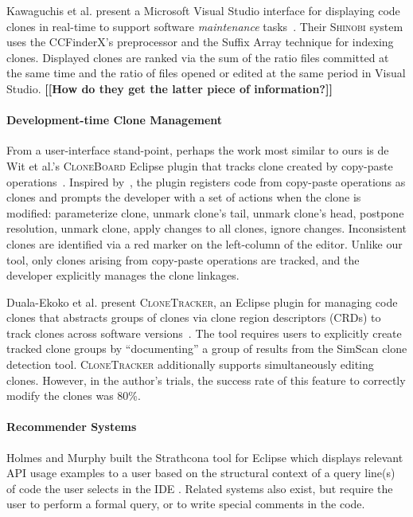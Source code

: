\documentclass[preprint,10pt]{sigplanconf}
\newcommand{\todo}[1]{{\bfseries [[#1]]}}
\begin{document}
Kawaguchis et al. present a  
Microsoft Visual Studio interface for
displaying code clones in real-time to support software
\emph{maintenance} tasks~\cite{Kawaguchi2009,Yamashina2008}. Their
\textsc{Shinobi} system uses the CCFinderX's preprocessor and the Suffix Array
technique for indexing clones. Displayed clones are ranked via the sum
of the ratio files committed at the same time and the ratio of files
opened or edited at the same period in Visual Studio. \todo{How do
  they get the latter piece of information?}

\paragraph{Development-time Clone Management}

From a user-interface stand-point, perhaps the work most similar to
ours is de Wit et al.'s \textsc{CloneBoard} Eclipse plugin that tracks
clone created by copy-paste operations~\cite{deWit2009}. Inspired
by~\cite{Mann2006}, the plugin registers code from copy-paste
operations as clones and prompts the developer with a set of actions
when the clone is modified: parameterize clone, unmark clone's tail,
unmark clone's head, postpone resolution, unmark clone, apply changes
to all clones, ignore changes. Inconsistent clones are identified via
a red marker on the left-column of the editor. Unlike our tool, only
clones arising from copy-paste operations are tracked, and the
developer explicitly manages the clone linkages.

Duala-Ekoko et al. present \textsc{CloneTracker}, an Eclipse plugin
for managing code clones that abstracts groups of clones via clone
region descriptors (CRDs) to track clones across software
versions~\cite{Duala-Ekoko2007}. The tool requires users to explicitly
create tracked clone groups by ``documenting'' a group of results from
the SimScan clone detection tool. \textsc{CloneTracker} additionally
supports simultaneously editing clones. However, in the author's
trials, the success rate of this feature to correctly modify the
clones was 80\%.

\paragraph{Recommender Systems}

Holmes and Murphy built the Strathcona tool for Eclipse which displays
relevant API usage examples to a user based on the structural context
of a query line(s) of code the user selects in the IDE
\cite{Holmes2005}. Related systems also exist, but require the user to
perform a formal query, or to write special comments in the code.
\end{document}
